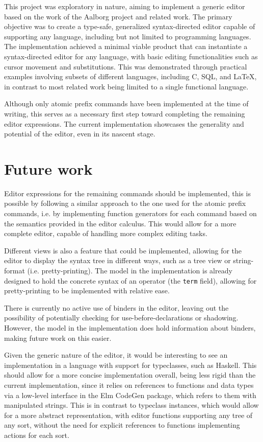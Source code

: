 This project was exploratory in nature, aiming to implement a generic editor based on the work of the Aalborg project\cite{aalborg} and related work. The primary objective was to create a type-safe, generalized syntax-directed editor capable of supporting any language, including but not limited to programming languages. The implementation achieved a minimal viable product that can instantiate a syntax-directed editor for any language, with basic editing functionalities such as cursor movement and substitutions. This was demonstrated through practical examples involving subsets of different languages, including C, SQL, and LaTeX, in contrast to most related work
being limited to a single functional language.

Although only atomic prefix commands have been implemented at the time of writing, this serves as a necessary first step toward completing the remaining editor expressions. The current implementation showcases the generality and potential of the editor, even in its nascent stage.

\section{Future work}
Editor expressions for the remaining commands should be implemented, this is possible by following a similar approach to the one used for the atomic prefix commands, i.e. by implementing function generators for each command based on the semantics provided in the editor calculus. This would allow for a more complete editor, capable of handling more complex editing tasks.

Different views is also a feature that could be implemented, allowing for the editor to display the syntax tree in different ways, such as a tree view or string-format (i.e. pretty-printing). The model in the implementation is already designed to hold the concrete syntax of an operator (the \texttt{term} field), allowing for pretty-printing to be implemented with relative ease.

There is currently no active use of binders in the editor, leaving
out the possibility of potentially checking for use-before-declarations or
shadowing. However, the model in the implementation does hold information about binders, making future work on this easier.

Given the generic nature of the editor, it would be interesting to see
an implementation in a language with support for typeclasses, such as Haskell.
This should allow for a more concise implementation overall, being less rigid
than the current implementation, since it relies on references to functions and
data types via a low-level interface in the Elm CodeGen package, which refers
to them with manipulated strings. This is in contrast to typeclass
instances, which would allow for a more abstract representation, with editor functions supporting any tree of any sort, without the need for explicit references to functions implementing actions for each sort.
